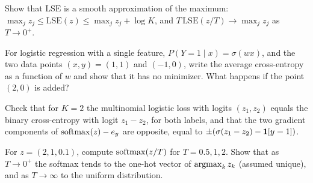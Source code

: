 \begin{notechapter}
\begin{exercise}\label{sigmoid-softmax:exr:3}
Show that $\mathrm{LSE}$ is a smooth approximation of the maximum: $\max_jz_j\leq\mathrm{LSE}(z)\leq\max_jz_j + \log K$,
and $T\,\mathrm{LSE}(z/T)\to\max_jz_j$ as $T\to0^+$.
\end{exercise}

\begin{exercise}\label{sigmoid-softmax:exr:4}
For logistic regression with a single feature, $P(Y = 1\mid x) = \sigma(wx)$, and the two
data points $(x, y) = (1, 1)$ and $(-1, 0)$, write the average cross-entropy as a function of
$w$ and show that it has no minimizer. What happens if the point $(2, 0)$ is added?
\end{exercise}

\begin{exercise}\label{sigmoid-softmax:exr:5}
Check that for $K = 2$ the multinomial logistic loss with logits $(z_1, z_2)$ equals the binary
cross-entropy with logit $z_1 - z_2$, for both labels, and that the two gradient
components of $\operatorname{softmax}(z) - e_y$ are opposite, equal to $\pm(\sigma(z_1 - z_2) - \mathbf{1}[y = 1])$.
\end{exercise}

\begin{exercise}\label{sigmoid-softmax:exr:6}
For $z = (2, 1, 0.1)$, compute $\operatorname{softmax}(z/T)$ for $T = 0.5, 1, 2$. Show that as $T\to0^+$ the softmax
tends to the one-hot vector of $\operatorname*{argmax}_kz_k$ (assumed unique), and as $T\to\infty$ to the
uniform distribution.
\end{exercise}
\end{notechapter}
